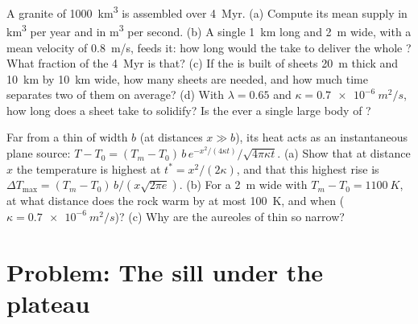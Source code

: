 \begin{exercise}[$\star\star\star$]\label{exo:b2:magma-emplacement:11}
A granite  of \qty{1000}{km^3} is assembled over \qty{4}{Myr}. (a) Compute
its mean  supply in \unit{km^3} per year and in \unit{m^3} per second. (b) A
single  \qty{1}{km} long and \qty{2}{m} wide, with a mean velocity of
\qty{0.8}{m/s}, feeds it: how long would the  take to deliver the whole
? What fraction of the \qty{4}{Myr} is that? (c) If the  is built of
sheets \qty{20}{m} thick and \qty{10}{km} by \qty{10}{km} wide, how many sheets
are needed, and how much time separates two of them on average? (d) With
$\lambda = 0.65$ and $\kappa = \qty{0.7e-6}{m^2/s}$, how long does a sheet take to
solidify? Is the  ever a single large body of ?
\end{exercise}

\begin{exercise}[$\star\star\star$]\label{exo:b2:magma-emplacement:12}
Far from a thin  of width $b$ (at distances $x \gg b$), its heat acts as an
instantaneous plane source: $T - T_0 = (T_m - T_0)\,b\,e^{-x^2/(4\kappa
t)}/\sqrt{4\pi\kappa t}$. (a) Show that at distance $x$ the temperature is highest at
$t^* = x^2/(2\kappa)$, and that this highest rise is $\Delta T_{\max} = (T_m -
T_0)\,b/(x\sqrt{2\pi e})$. (b) For a  \qty{2}{m} wide with $T_m - T_0 =
\qty{1100}{K}$, at what distance does the rock warm by at most \qty{100}{K}, and
when ($\kappa = \qty{0.7e-6}{m^2/s}$)? (c) Why are the aureoles of thin  so
narrow?
\end{exercise}

\section{Problem: The sill under the plateau}

